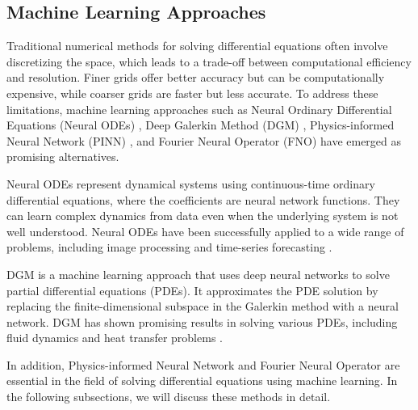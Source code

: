 
\subsection{Machine Learning Approaches}

Traditional numerical methods for solving differential equations often involve discretizing the space, which leads to a trade-off between computational efficiency and resolution. Finer grids offer better accuracy but can be computationally expensive, while coarser grids are faster but less accurate. To address these limitations, machine learning approaches such as Neural Ordinary Differential Equations (Neural ODEs) \cite{chen2018neural}, Deep Galerkin Method (DGM) \cite{sirignano2018dgm}, Physics-informed Neural Network (PINN) \cite{raissi2019physics}, and Fourier Neural Operator (FNO) have emerged as promising alternatives.

Neural ODEs represent dynamical systems using continuous-time ordinary differential equations, where the coefficients are neural network functions. They can learn complex dynamics from data even when the underlying system is not well understood. Neural ODEs have been successfully applied to a wide range of problems, including image processing \cite{chen2020mri} and time-series forecasting \cite{chen2022forecasting,gao2022explainable}.

DGM is a machine learning approach that uses deep neural networks to solve partial differential equations (PDEs). It approximates the PDE solution by replacing the finite-dimensional subspace in the Galerkin method with a neural network. DGM has shown promising results in solving various PDEs, including fluid dynamics \cite{li2022deep} and heat transfer problems \cite{zhang2022deep}.

In addition, Physics-informed Neural Network and Fourier Neural Operator are essential in the field of solving differential equations using machine learning. In the following subsections, we will discuss these methods in detail.


